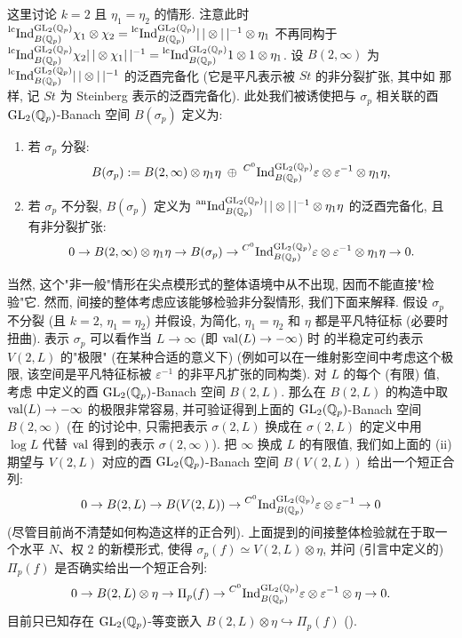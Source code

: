 \begin{remark}\label{rem:2.3.1}
这里讨论 $k = 2$ 且 $\eta_1 = \eta_2$ 的情形.
注意此时 $\prescript{\mathrm{lc}}{}{\mathrm{Ind}}_{B(\mathbb{Q}_p)}^{\mathrm{GL}_2(\mathbb{Q}_p)} \chi_1 \otimes \chi_2 = \prescript{\mathrm{lc}}{}{\mathrm{Ind}}_{B(\mathbb{Q}_p)}^{\mathrm{GL}_2(\mathbb{Q}_p)} |\,| \otimes |\,|^{-1} \otimes \eta_1$ 不再同构于 $\prescript{\mathrm{lc}}{}{\mathrm{Ind}}_{B(\mathbb{Q}_p)}^{\mathrm{GL}_2(\mathbb{Q}_p)} \chi_2|\,| \otimes \chi_1|\,|^{-1} = \prescript{\mathrm{lc}}{}{\mathrm{Ind}}_{B(\mathbb{Q}_p)}^{\mathrm{GL}_2(\mathbb{Q}_p)} 1 \otimes 1 \otimes \eta_1$.
设 $B(2,\infty)$ 为 $\prescript{\mathrm{lc}}{}{\mathrm{Ind}}_{B(\mathbb{Q}_p)}^{\mathrm{GL}_2(\mathbb{Q}_p)} |\,| \otimes |\,|^{-1}$ 的泛酉完备化 (它是平凡表示被 $St$ 的非分裂扩张, 其中如 \cite{ref:8} 那样, 记 $St$ 为 Steinberg 表示的泛酉完备化).
此处我们被诱使把与 $\sigma_p$ 相关联的酉 $\mathrm{GL}_2(\mathbb{Q}_p)$-Banach 空间 $B(\sigma_p)$ 定义为:
\begin{enumerate}
\item[(i)] 若 $\sigma_p$ 分裂:
\[
B(\sigma_p) := B(2,\infty) \otimes \eta_1\eta \;\oplus\; \prescript{C^{0}}{}{\mathrm{Ind}}_{B(\mathbb{Q}_p)}^{\mathrm{GL}_2(\mathbb{Q}_p)} \varepsilon \otimes \varepsilon^{-1} \otimes \eta_1\eta,
\]
\item[(ii)] 若 $\sigma_p$ 不分裂, $B(\sigma_p)$ 定义为 $\prescript{\mathrm{an}}{}{\mathrm{Ind}}_{B(\mathbb{Q}_p)}^{\mathrm{GL}_2(\mathbb{Q}_p)} |\,| \otimes |\,|^{-1} \otimes \eta_1\eta$ 的泛酉完备化, 且有非分裂扩张:
\[
0 \to B(2,\infty) \otimes \eta_1\eta \to B(\sigma_p) \to \prescript{C^{0}}{}{\mathrm{Ind}}_{B(\mathbb{Q}_p)}^{\mathrm{GL}_2(\mathbb{Q}_p)} \varepsilon \otimes \varepsilon^{-1} \otimes \eta_1\eta \to 0.
\]
\end{enumerate}
当然, 这个"非一般"情形在尖点模形式的整体语境中从不出现, 因而不能直接"检验"它.
然而, 间接的整体考虑应该能够检验非分裂情形, 我们下面来解释.
假设 $\sigma_p$ 不分裂 (且 $k = 2$, $\eta_1 = \eta_2$) 并假设, 为简化, $\eta_1 = \eta_2$ 和 $\eta$ 都是平凡特征标 (必要时扭曲).
表示 $\sigma_p$ 可以看作当 $L \to \infty$ (即 $\operatorname{val}(L) \to -\infty$) 时 \cite[Ex.~1.3.5]{ref:8} 的半稳定可约表示 $V(2,L)$ 的"极限" (在某种合适的意义下) (例如可以在一维射影空间中考虑这个极限, 该空间是平凡特征标被 $\varepsilon^{-1}$ 的非平凡扩张的同构类).
对 $L$ 的每个 (有限) 值, 考虑 \cite{ref:8} 中定义的酉 $\mathrm{GL}_2(\mathbb{Q}_p)$-Banach 空间 $B(2,L)$.
那么在 $B(2,L)$ 的构造中取 $\operatorname{val}(L) \to -\infty$ 的极限非常容易, 并可验证得到上面的 $\mathrm{GL}_2(\mathbb{Q}_p)$-Banach 空间 $B(2,\infty)$ (在 \cite[\S4.5]{ref:8} 的讨论中, 只需把表示 $\sigma(2,L)$ 换成在 $\sigma(2,L)$ 的定义中用 $\log L$ 代替 $\operatorname{val}$ 得到的表示 $\sigma(2,\infty)$).
把 $\infty$ 换成 $L$ 的有限值, 我们如上面的 (ii) 期望与 $V(2,L)$ 对应的酉 $\mathrm{GL}_2(\mathbb{Q}_p)$-Banach 空间 $B(V(2,L))$ 给出一个短正合列:
\[
0 \to B(2,L) \to B(V(2,L)) \to \prescript{C^{0}}{}{\mathrm{Ind}}_{B(\mathbb{Q}_p)}^{\mathrm{GL}_2(\mathbb{Q}_p)} \varepsilon \otimes \varepsilon^{-1} \to 0
\]
(尽管目前尚不清楚如何构造这样的正合列).
上面提到的间接整体检验就在于取一个水平 $N$、权 $2$ 的新模形式, 使得 $\sigma_p(f) \simeq V(2,L) \otimes \eta$, 并问 (引言中定义的) $\Pi_p(f)$ 是否确实给出一个短正合列:
\[
0 \to B(2,L) \otimes \eta \to \Pi_p(f) \to \prescript{C^{0}}{}{\mathrm{Ind}}_{B(\mathbb{Q}_p)}^{\mathrm{GL}_2(\mathbb{Q}_p)} \varepsilon \otimes \varepsilon^{-1} \otimes \eta \to 0.
\]
目前只已知存在 $\mathrm{GL}_2(\mathbb{Q}_p)$-等变嵌入 $B(2,L) \otimes \eta \hookrightarrow \Pi_p(f)$ (\cite{ref:9}).
\end{remark}


